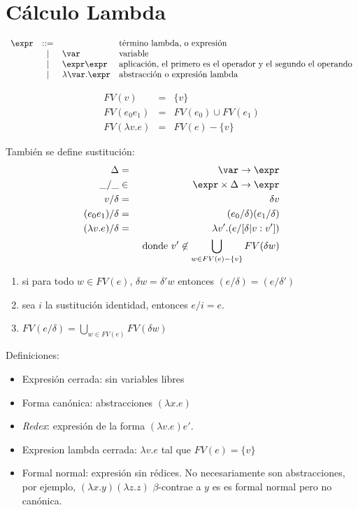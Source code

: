 \section{Cálculo Lambda}
  \[
    \begin{array}{rcll}
      \expr &::= && \text{término lambda, o expresión} \\
          &|& \var & \text{variable} \\
          &|& \expr \expr & \text{aplicación, el primero es el operador y el segundo el operando} \\
          &|& \lambda \var.\expr & \text{abstracción o expresión lambda} \\
    \end{array}
  \]

  \begin{eqnarray*}
    FV(v) &=& \{v\} \\
    FV(e_0 e_1) &=& FV(e_0)\cup FV(e_1) \\
    FV(\lambda v.e) &=& FV(e) - \{v\}
  \end{eqnarray*}
        
  \PN También se define sustitución:
  \begin{eqnarray*}
    \Delta &=& \var \to \expr \\
    \_/\_ &\in& \expr \times \Delta \to \expr \\
    v/\delta &=& \delta v \\
    (e_0 e_1)/\delta &=& (e_0/\delta) (e_1/\delta) \\
    (\lambda v.e)/\delta &=& \lambda v'.(e/[\delta|v:v']) \\
    && \text{ donde } v' \not\in \bigcup_{w \in FV(e) - \{v\}} FV(\delta w)
  \end{eqnarray*}
        
  \begin{property} \hfill
    \begin{enumerate}
    \item si para todo $w \in FV(e)$, $\delta w = \delta' w$ entonces
      $(e/\delta) = (e/\delta')$
    \item sea $i$ la sustitución identidad, entonces $e/i = e$.
    \item $FV(e/\delta) = \bigcup_{w\in FV(e)} FV(\delta w)$
    \end{enumerate}
  \end{property}

  \PN Definiciones:
  \begin{itemize}
    \item Expresión cerrada: sin variables libres
    \item Forma canónica: abstracciones $(\lambda x.e)$
    \item \textit{Redex}: expresión de la forma $(\lambda v.e) e'$.
    \item Expresion lambda cerrada: $\lambda v.e$ tal que $FV(e) = \{v\}$
    \item Formal normal: expresión sin rédices. No necesariamente son abstracciones, por ejemplo, $(\lambda x.y) (\lambda z.z)$ $\beta$-contrae a $y$ es es formal normal pero no canónica.
  \end{itemize}
        
